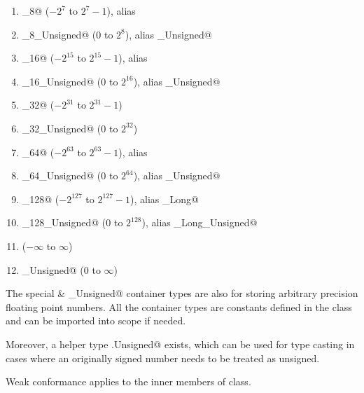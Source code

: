 \begin{enumerate}

\item \lstinline@Integer_8@ ($-2^{7}$ to $2^{7}-1$), alias \lstinline@Byte@

\item \lstinline@Integer_8_Unsigned@ ($0$ to $2^{8}$), alias \lstinline@Byte_Unsigned@

\item \lstinline@Integer_16@ ($-2^{15}$ to $2^{15}-1$), alias \lstinline@Short@

\item \lstinline@Integer_16_Unsigned@ ($0$ to $2^{16}$), alias \lstinline@Short_Unsigned@

\item \lstinline@Integer_32@ ($-2^{31}$ to $2^{31}-1$)

\item \lstinline@Integer_32_Unsigned@ ($0$ to $2^{32}$)

\item \lstinline@Integer_64@ ($-2^{63}$ to $2^{63}-1$), alias \lstinline@Long@

\item \lstinline@Integer_64_Unsigned@ ($0$ to $2^{64}$), alias \lstinline@Long_Unsigned@

\item \lstinline@Integer_128@ ($-2^{127}$ to $2^{127}-1$), alias \lstinline@Double_Long@

\item \lstinline@Integer_128_Unsigned@ ($0$ to $2^{128}$), alias \lstinline@Double_Long_Unsigned@

\item \lstinline@Decimal@ ($-\infty$ to $\infty$)

\item \lstinline@Decimal_Unsigned@ ($0$ to $\infty$)

\end{enumerate}

The special \lstinline@Decimal@ \& \lstinline@Decimal_Unsigned@ container types are also for storing arbitrary precision floating point numbers. All the container types are constants defined in the \lstinline@Number@ class and can be imported into scope if needed. 

Moreover, a helper type \lstinline@Number.Unsigned@ exists, which can be used for type casting in cases where an originally signed number needs to be treated as unsigned. 

Weak conformance applies to the inner members of \lstinline@Number@ class. 

